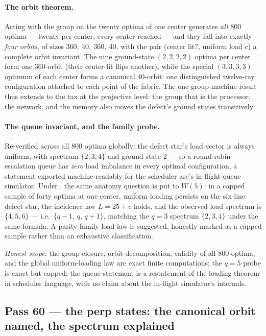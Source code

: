 \documentclass[11pt]{article}
\begin{document}
\paragraph{The orbit theorem.}  Acting with the group on the twenty optima of
one center generates \emph{all} \(800\) optima --- twenty per center, every
center reached --- and they fall into exactly \emph{four orbits}, of sizes
\(360,\ 40,\ 360,\ 40\), with the pair (center lit?, uniform load \(c\)) a
complete orbit invariant.  The nine ground-state \((2,2,2,2)\) optima per
center form one \(360\)-orbit (their center-lit flips another), while the
special \((3,3,3,3)\) optimum of each center forms a canonical \(40\)-orbit:
one distinguished twelve-ray configuration attached to each point of the
fabric.  The one-group-machine result thus extends to the tax at the projective
level: the group that is the processor, the network, and the memory also moves
the defect's ground states transitively.

\paragraph{The queue invariant, and the family probe.}  Re-verified across all
\(800\) optima globally: the defect star's load vector is always uniform, with
spectrum \(\{2,3,4\}\) and ground state \(2\) --- so a round-robin escalation
queue has \emph{zero} load imbalance in every optimal configuration, a
statement exported machine-readably for the scheduler arc's in-flight queue
simulator.  Under , the same anatomy question is put to \(W(5)\):
in a capped sample of forty optima at one center, uniform loading persists on
the six-line defect star, the incidence law \(L = 25 + c\) holds, and the
observed load spectrum is \(\{4,5,6\}\) --- i.e.\ \(\{q-1,\,q,\,q+1\}\),
matching the \(q=3\) spectrum \(\{2,3,4\}\) under the same formula.  A
parity-family load law is suggested, honestly marked as a capped sample rather
than an exhaustive classification.

\emph{Honest scope:} the group closure, orbit decomposition, validity of all
\(800\) optima, and the global uniform-loading law are exact finite
computations; the \(q=5\) probe is exact but capped; the queue statement is a
restatement of the loading theorem in scheduler language, with no claim about
the in-flight simulator's internals.

\subsection{Pass 60 --- the perp states: the canonical orbit named, the spectrum explained}
\label{sec:capstone-sixty}
\end{document}
